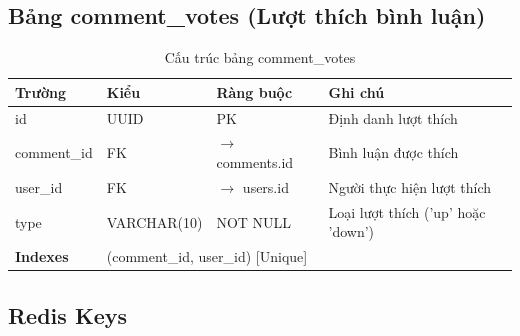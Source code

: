 \documentclass[12pt,a4paper]{article}
\begin{document}
\subsection{Bảng comment\_votes (Lượt thích bình luận)}
\begin{longtable}{|l|l|l|p{5.5cm}|}
    \caption{Cấu trúc bảng comment\_votes}                                                                                                    \\
    \hline
    \rowcolor{headerblue}
    \textbf{Trường}  & \textbf{Kiểu}                                         & \textbf{Ràng buộc}        & \textbf{Ghi chú}                   \\
    \hline
    id               & UUID                                                  & PK                        & Định danh lượt thích               \\
    \hline
    comment\_id      & FK                                                    & $\rightarrow$ comments.id & Bình luận được thích               \\
    \hline
    user\_id         & FK                                                    & $\rightarrow$ users.id    & Người thực hiện lượt thích         \\
    \hline
    type             & VARCHAR(10)                                           & NOT NULL                  & Loại lượt thích ('up' hoặc 'down') \\
    \hline
    \rowcolor{headerblue}
    \textbf{Indexes} & \multicolumn{3}{l|}{(comment\_id, user\_id) [Unique]}                                                                  \\
    \hline
\end{longtable}

\subsection{Redis Keys}
\end{document}
